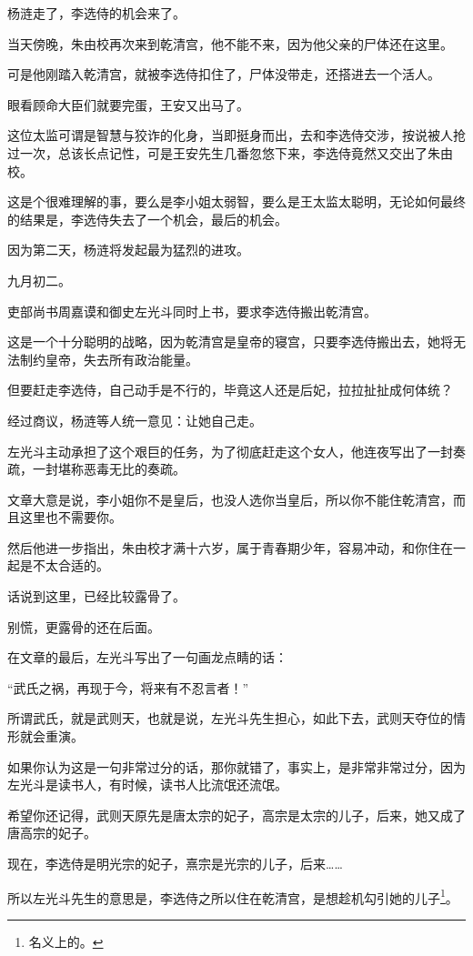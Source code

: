 \begin{multicols}{\theparacolNo}
杨涟走了，李选侍的机会来了。

当天傍晚，朱由校再次来到乾清宫，他不能不来，因为他父亲的尸体还在这里。

可是他刚踏入乾清宫，就被李选侍扣住了，尸体没带走，还搭进去一个活人。

眼看顾命大臣们就要完蛋，王安又出马了。

这位太监可谓是智慧与狡诈的化身，当即挺身而出，去和李选侍交涉，按说被人抢过一次，总该长点记性，可是王安先生几番忽悠下来，李选侍竟然又交出了朱由校。

这是个很难理解的事，要么是李小姐太弱智，要么是王太监太聪明，无论如何最终的结果是，李选侍失去了一个机会，最后的机会。

因为第二天，杨涟将发起最为猛烈的进攻。

九月初二。

吏部尚书周嘉谟和御史左光斗同时上书，要求李选侍搬出乾清宫。

这是一个十分聪明的战略，因为乾清宫是皇帝的寝宫，只要李选侍搬出去，她将无法制约皇帝，失去所有政治能量。

但要赶走李选侍，自己动手是不行的，毕竟这人还是后妃，拉拉扯扯成何体统？

经过商议，杨涟等人统一意见：让她自己走。

左光斗主动承担了这个艰巨的任务，为了彻底赶走这个女人，他连夜写出了一封奏疏，一封堪称恶毒无比的奏疏。

文章大意是说，李小姐你不是皇后，也没人选你当皇后，所以你不能住乾清宫，而且这里也不需要你。

然后他进一步指出，朱由校才满十六岁，属于青春期少年，容易冲动，和你住在一起是不太合适的。

话说到这里，已经比较露骨了。

别慌，更露骨的还在后面。

在文章的最后，左光斗写出了一句画龙点睛的话：

“武氏之祸，再现于今，将来有不忍言者！”

所谓武氏，就是武则天，也就是说，左光斗先生担心，如此下去，武则天夺位的情形就会重演。

如果你认为这是一句非常过分的话，那你就错了，事实上，是非常非常过分，因为左光斗是读书人，有时候，读书人比流氓还流氓。

希望你还记得，武则天原先是唐太宗的妃子，高宗是太宗的儿子，后来，她又成了唐高宗的妃子。

现在，李选侍是明光宗的妃子，熹宗是光宗的儿子，后来……

所以左光斗先生的意思是，李选侍之所以住在乾清宫，是想趁机勾引她的儿子\footnote{名义上的。}。


\end{multicols}
